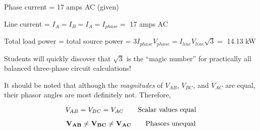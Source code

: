 \vskip 10pt

Phase current = 17 amps AC (given)

Line current = $I_{A} = I_{B} = I_{A} = I_{phase} = $ 17 amps AC

\vskip 10pt

Total load power = total source power = $3 I_{phase} V_{phase} = I_{line} V_{line} \sqrt{3} = $ 14.13 kW







Students will quickly discover that $\sqrt{3}$ is the ``magic number'' for practically all balanced three-phase circuit calculations!

It should be noted that although the {\it magnitudes} of $V_{AB}$, $V_{BC}$, and $V_{AC}$ are equal, their phasor angles are most definitely not.  Therefore,

$$V_{AB} = V_{BC} = V_{AC} \hbox{\hskip 20pt Scalar values equal}$$

$${\bf V_{AB}} \neq {\bf V_{BC}} \neq {\bf V_{AC}} \hbox{\hskip 20pt Phasors unequal}$$




